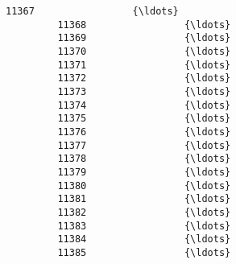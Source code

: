 \documentclass[11pt]{article}
\begin{document}
\begin{Verbatim}[commandchars=\\\{\}]
         11367                 {\ldots}                    
         11368                 {\ldots}                    
         11369                 {\ldots}                    
         11370                 {\ldots}                    
         11371                 {\ldots}                    
         11372                 {\ldots}                    
         11373                 {\ldots}                    
         11374                 {\ldots}                    
         11375                 {\ldots}                    
         11376                 {\ldots}                    
         11377                 {\ldots}                    
         11378                 {\ldots}                    
         11379                 {\ldots}                    
         11380                 {\ldots}                    
         11381                 {\ldots}                    
         11382                 {\ldots}                    
         11383                 {\ldots}                    
         11384                 {\ldots}                    
         11385                 {\ldots}                    
         

\end{Verbatim}
\end{document}
